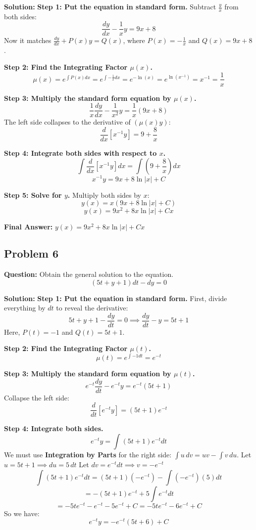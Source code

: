 \documentclass[11pt]{article}
\begin{document}
\textbf{Solution:}
\textbf{Step 1: Put the equation in standard form.}
Subtract $\frac{y}{x}$ from both sides:
\[ \frac{dy}{dx} - \frac{1}{x}y = 9x + 8 \]
Now it matches $\frac{dy}{dx} + P(x)y = Q(x)$, where $P(x) = -\frac{1}{x}$ and $Q(x) = 9x + 8$.

\textbf{Step 2: Find the Integrating Factor $\mu(x)$.}
\[ \mu(x) = e^{\int P(x) dx} = e^{\int -\frac{1}{x} dx} = e^{-\ln(x)} = e^{\ln(x^{-1})} = x^{-1} = \frac{1}{x} \]

\textbf{Step 3: Multiply the standard form equation by $\mu(x)$.}
\[ \frac{1}{x} \frac{dy}{dx} - \frac{1}{x^2} y = \frac{1}{x} (9x + 8) \]
The left side collapses to the derivative of $(\mu(x) y)$:
\[ \frac{d}{dx} \left[ x^{-1} y \right] = 9 + \frac{8}{x} \]

\textbf{Step 4: Integrate both sides with respect to $x$.}
\[ \int \frac{d}{dx} \left[ x^{-1} y \right] dx = \int \left( 9 + \frac{8}{x} \right) dx \]
\[ x^{-1} y = 9x + 8\ln|x| + C \]

\textbf{Step 5: Solve for $y$.}
Multiply both sides by $x$:
\[ y(x) = x(9x + 8\ln|x| + C) \]
\[ y(x) = 9x^2 + 8x\ln|x| + Cx \]

\textbf{Final Answer:} $y(x) = 9x^2 + 8x\ln|x| + Cx$

\hrulefill

\subsection*{Problem 6}
\textbf{Question:} Obtain the general solution to the equation.
\[ (5t + y + 1)dt - dy = 0 \]

\textbf{Solution:}
\textbf{Step 1: Put the equation in standard form.}
First, divide everything by $dt$ to reveal the derivative:
\[ 5t + y + 1 - \frac{dy}{dt} = 0 \implies \frac{dy}{dt} - y = 5t + 1 \]
Here, $P(t) = -1$ and $Q(t) = 5t + 1$.

\textbf{Step 2: Find the Integrating Factor $\mu(t)$.}
\[ \mu(t) = e^{\int -1 dt} = e^{-t} \]

\textbf{Step 3: Multiply the standard form equation by $\mu(t)$.}
\[ e^{-t} \frac{dy}{dt} - e^{-t} y = e^{-t} (5t + 1) \]
Collapse the left side:
\[ \frac{d}{dt} \left[ e^{-t} y \right] = (5t + 1)e^{-t} \]

\textbf{Step 4: Integrate both sides.}
\[ e^{-t} y = \int (5t + 1)e^{-t} dt \]
We must use \textbf{Integration by Parts} for the right side: $\int u \, dv = uv - \int v \, du$.
Let $u = 5t + 1 \implies du = 5 \, dt$
Let $dv = e^{-t} dt \implies v = -e^{-t}$
\[ \int (5t + 1)e^{-t} dt = (5t + 1)(-e^{-t}) - \int (-e^{-t})(5) dt \]
\[ = -(5t + 1)e^{-t} + 5 \int e^{-t} dt \]
\[ = -5te^{-t} - e^{-t} - 5e^{-t} + C = -5te^{-t} - 6e^{-t} + C \]
So we have:
\[ e^{-t} y = -e^{-t}(5t + 6) + C \]
\end{document}

